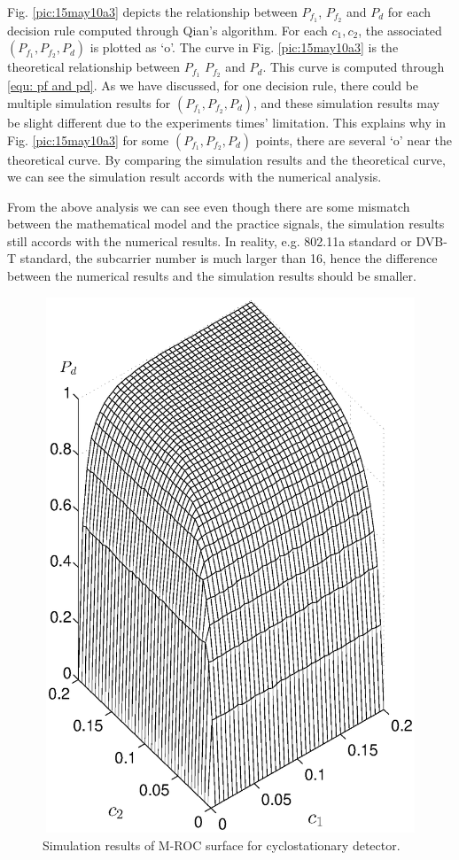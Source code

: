 Fig. \ref{pic:15may10a3} depicts the relationship between $P_{f_1}$, $P_{f_2}$ and $P_d$ for each decision rule computed through Qian's algorithm.  
For each $c_1, c_2$, the associated $(P_{f_1}, P_{f_2}, P_d) $ is plotted as `o'.
The curve in Fig. \ref{pic:15may10a3} is the theoretical relationship between $P_{f_1}$ $P_{f_2}$ and $P_d$. This curve is computed through \eqref{equ: pf and pd}. 
As we have discussed, for one decision rule, there could be multiple simulation results for $(P_{f_1}, P_{f_2}, P_d)$, and these simulation results may be slight different due to the experiments times' limitation. 
This explains why in Fig. \ref{pic:15may10a3} for some $(P_{f_1}, P_{f_2}, P_d)$ points, there are several  `o' near the theoretical curve.
By comparing the simulation results and the theoretical curve, we can see the simulation result accords with the numerical analysis. 

From the above analysis we can see even though there are some mismatch between the mathematical model and the practice signals, the simulation results still accords with the numerical results. In reality, e.g. 802.11a standard or DVB-T standard, the subcarrier number is much larger than 16, hence the difference between the numerical results and the simulation results should be  smaller. 


\begin{figure}[!t]
  \centering 
  \includegraphics[width=12cm, height=16cm]{4/Cyc1c2pd.eps}
  \caption{Simulation results of M-ROC surface for cyclostationary detector.}
  \label{pic:15may09a1}
\end{figure}

